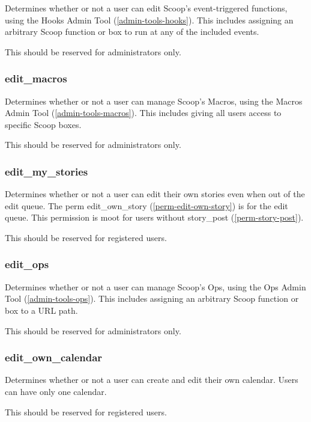 Determines whether or not a user can edit Scoop's event-triggered functions, using the Hooks Admin Tool (\ref{admin-tools-hooks}).  This includes assigning an arbitrary Scoop function or box to run at any of the included events.

This should be reserved for administrators only.

\subsubsection{edit\_macros}
\label{perm-edit-macros}

Determines whether or not a user can manage Scoop's Macros, using the Macros Admin Tool (\ref{admin-tools-macros}). This includes giving all users access to specific Scoop boxes.

This should be reserved for administrators only.

\subsubsection{edit\_my\_stories}
\label{perm-edit-my-stories}

Determines whether or not a user can edit their own stories even when out of the edit queue. The perm edit\_own\_story (\ref{perm-edit-own-story}) is for the edit queue. This permission is moot for users without story\_post (\ref{perm-story-post}).

This should be reserved for registered users.

\subsubsection{edit\_ops}
\label{perm-edit-ops}

Determines whether or not a user can manage Scoop's Ops, using the Ops Admin Tool (\ref{admin-tools-ops}).  This includes assigning an arbitrary Scoop function or box to a URL path.

This should be reserved for administrators only.

\subsubsection{edit\_own\_calendar}
\label{perm-edit-own-calendar}

Determines whether or not a user can create and edit their own calendar. Users can have only one calendar.

This should be reserved for registered users.

